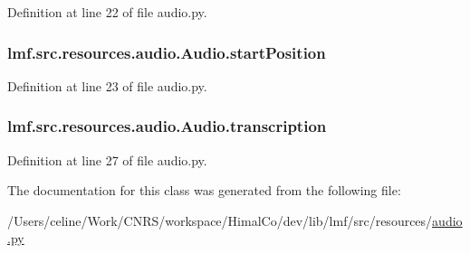 Definition at line 22 of file audio.\+py.

\hypertarget{classlmf_1_1src_1_1resources_1_1audio_1_1_audio_a5ff81f6d9d1f1d078a067f73594758f4}{
\subsubsection[{start\+Position}]{\setlength{\rightskip}{0pt plus 5cm}lmf.\+src.\+resources.\+audio.\+Audio.\+start\+Position}}\label{classlmf_1_1src_1_1resources_1_1audio_1_1_audio_a5ff81f6d9d1f1d078a067f73594758f4}


Definition at line 23 of file audio.\+py.

\hypertarget{classlmf_1_1src_1_1resources_1_1audio_1_1_audio_ab8d1f2cfa0f42732f123177df3b56849}{
\subsubsection[{transcription}]{\setlength{\rightskip}{0pt plus 5cm}lmf.\+src.\+resources.\+audio.\+Audio.\+transcription}}\label{classlmf_1_1src_1_1resources_1_1audio_1_1_audio_ab8d1f2cfa0f42732f123177df3b56849}


Definition at line 27 of file audio.\+py.



The documentation for this class was generated from the following file\+:\begin{DoxyCompactItemize}
\item 
/\+Users/celine/\+Work/\+C\+N\+R\+S/workspace/\+Himal\+Co/dev/lib/lmf/src/resources/\hyperlink{audio_8py}{audio.\+py}\end{DoxyCompactItemize}
